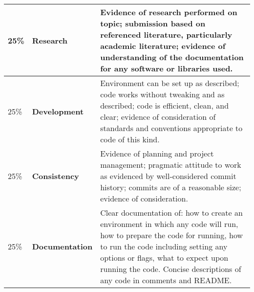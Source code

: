 \documentclass[a4paper, 12pt]{scrartcl}
\begin{document}
  \begin{center}
    \begin{tabular}{llp{8.4cm}}
      \toprule
      25\% & \textbf{Research} & Evidence of research performed on topic; submission based on referenced literature, particularly academic literature; evidence of understanding of the documentation for any software or libraries used. \\
      \midrule
      25\% & \textbf{Development} & Environment can be set up as described; code works without tweaking and as described; code is efficient, clean, and clear; evidence of consideration of standards and conventions appropriate to code of this kind. \\
      \midrule
      25\% & \textbf{Consistency} & Evidence of planning and project management; pragmatic attitude to work as evidenced by well-considered commit history; commits are of a reasonable size; evidence of consideration. \\
      \midrule
      25\% & \textbf{Documentation} & Clear documentation of: how to create an environment in which any code will run, how to prepare the code for running, how to run the code including setting any options or flags, what to expect upon running the code. Concise descriptions of any code in comments and README. \\
      \bottomrule
    \end{tabular}
  \end{center}
  



  
  
\end{document}
